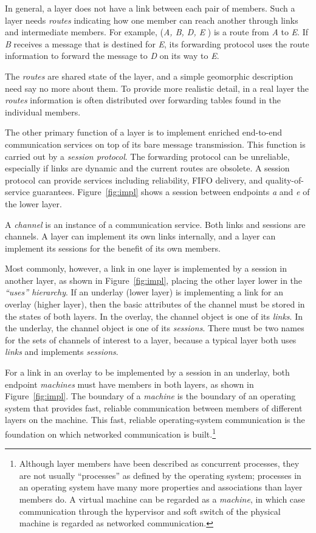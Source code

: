 In general, a layer does not have a link between each pair of members.
Such a layer needs {\it routes}
indicating how one member can reach another through links and
intermediate members.
For example, ({\it A, B, D, E} ) is a route from {\it A} to {\it E}.
If {\it B} receives a message that is destined
for {\it E}, its forwarding protocol uses the route information
to forward the message to {\it D} on its way to {\it E}.

The {\it routes} are shared state of the layer, and a simple 
geomorphic description need say no more about them. 
To provide more realistic detail, in a real layer the {\it routes}
information is often distributed over forwarding tables found in
the individual members.

The other primary function of a layer is to implement enriched
end-to-end
communication services on top of its bare message transmission.
This function is carried out by a {\it session protocol}.
The forwarding protocol can be unreliable, especially if links are
dynamic and the current routes are obsolete.
A session protocol can provide services including reliability,
FIFO delivery,
and quality-of-service guarantees.
Figure~\ref{fig:impl} shows a session between endpoints {\it a}
and {\it e} of the lower layer.

A {\it channel} is an instance of a communication
service.
Both links and sessions are channels.
A layer can implement its own links internally, and a
layer can implement its sessions for the benefit of its own
members.

Most commonly, however, a link in one layer is
implemented by a session in another layer,
as shown in Figure~\ref{fig:impl}, placing the other
layer lower in the {\it ``uses'' hierarchy}.
If an underlay (lower layer) is implementing a link for an overlay
(higher layer), then the basic attributes of the channel must be
stored in the states of both layers.
In the overlay, the channel object is one of its {\it links}.
In the underlay, the channel object is one of its {\it sessions}.
There must be two names for the sets of channels of interest to a layer,
because a typical layer both uses {\it links} and 
implements {\it sessions}.

For a link in an overlay to be implemented by a session in an underlay,
both endpoint {\it machines} must have members in both layers,
as shown in Figure~\ref{fig:impl}.
The boundary of a
{\it machine} is the boundary of an operating system that provides fast,
reliable communication between members of different layers on the machine.
This fast, reliable operating-system
communication is the foundation on which networked
communication is built.\footnote{Although layer members have been
described as concurrent processes, they are not usually ``processes''
as defined by the operating system; processes in an operating system
have many more properties and associations than layer members do.  
A virtual machine can be regarded as a {\it machine}, in which case
communication through the hypervisor and soft switch of the physical
machine is regarded as networked communication.}

